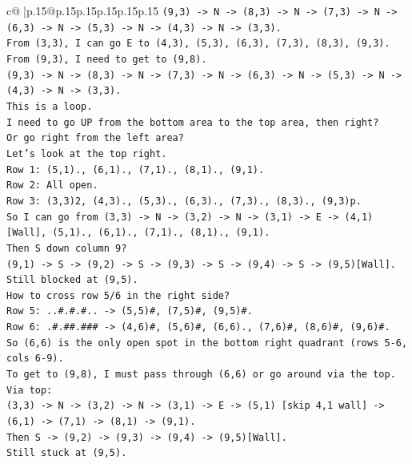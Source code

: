 \documentclass{article}
\begin{document}
{\begin{supertabular}{c@{$\;$}|p{.15\linewidth}@{}p{.15\linewidth}p{.15\linewidth}p{.15\linewidth}p{.15\linewidth}p{.15\linewidth}}
{{{\texttt{(9,3) {-}> N {-}> (8,3) {-}> N {-}> (7,3) {-}> N {-}> (6,3) {-}> N {-}> (5,3) {-}> N {-}> (4,3) {-}> N {-}> (3,3).} \\
\texttt{From (3,3), I can go E to (4,3), (5,3), (6,3), (7,3), (8,3), (9,3).} \\
\texttt{From (9,3), I need to get to (9,8).} \\
\texttt{(9,3) {-}> N {-}> (8,3) {-}> N {-}> (7,3) {-}> N {-}> (6,3) {-}> N {-}> (5,3) {-}> N {-}> (4,3) {-}> N {-}> (3,3).} \\
\texttt{This is a loop.} \\
\texttt{I need to go UP from the bottom area to the top area, then right?} \\
\texttt{Or go right from the left area?} \\
\texttt{Let's look at the top right.} \\
\texttt{Row 1: (5,1)., (6,1)., (7,1)., (8,1)., (9,1).} \\
\texttt{Row 2: All open.} \\
\texttt{Row 3: (3,3)2, (4,3)., (5,3)., (6,3)., (7,3)., (8,3)., (9,3)p.} \\
\texttt{So I can go from (3,3) {-}> N {-}> (3,2) {-}> N {-}> (3,1) {-}> E {-}> (4,1){[}Wall{]}, (5,1)., (6,1)., (7,1)., (8,1)., (9,1).} \\
\texttt{Then S down column 9?} \\
\texttt{(9,1) {-}> S {-}> (9,2) {-}> S {-}> (9,3) {-}> S {-}> (9,4) {-}> S {-}> (9,5){[}Wall{]}.} \\
\texttt{Still blocked at (9,5).} \\
\texttt{How to cross row 5/6 in the right side?} \\
\texttt{Row 5: ..\#.\#.\#.. {-}> (5,5)\#, (7,5)\#, (9,5)\#.} \\
\texttt{Row 6: .\#.\#\#.\#\#\# {-}> (4,6)\#, (5,6)\#, (6,6)., (7,6)\#, (8,6)\#, (9,6)\#.} \\
\texttt{So (6,6) is the only open spot in the bottom right quadrant (rows 5{-}6, cols 6{-}9).} \\
\texttt{To get to (9,8), I must pass through (6,6) or go around via the top.} \\
\texttt{Via top:} \\
\texttt{(3,3) {-}> N {-}> (3,2) {-}> N {-}> (3,1) {-}> E {-}> (5,1) {[}skip 4,1 wall{]} {-}> (6,1) {-}> (7,1) {-}> (8,1) {-}> (9,1).} \\
\texttt{Then S {-}> (9,2) {-}> (9,3) {-}> (9,4) {-}> (9,5){[}Wall{]}.} \\
\texttt{Still stuck at (9,5).} \\
}}}
\end{supertabular}}
\end{document}
